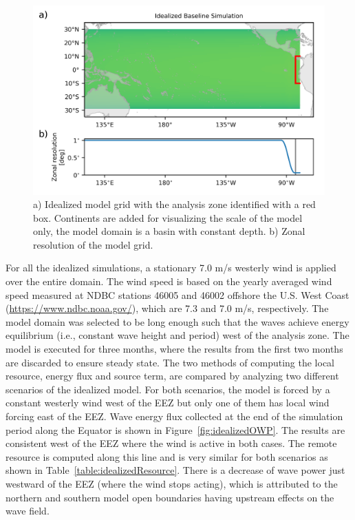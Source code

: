 \begin{figure}[ht]
  \includegraphics[width=4.5in]{../../diagram/appendixB_Figure1.png}
  \caption{a) Idealized model grid with the analysis zone identified with a red box. Continents are added for visualizing the scale of the model only, the model domain is a basin with constant depth. b) Zonal resolution of the model grid.}
  \label{fig:idealizedDomain}
\end{figure}

For all the idealized simulations, a stationary 7.0 m/s westerly wind is applied over the entire domain. The wind speed is based on the yearly averaged wind speed measured at NDBC stations 46005 and 46002 offshore the U.S. West Coast (\url{https://www.ndbc.noaa.gov/}), which are 7.3 and 7.0 m/s, respectively. The model domain was selected to be long enough such that the waves achieve energy equilibrium (i.e., constant wave height and period) west of the analysis zone. The model is executed for three months, where the results from the first two months are discarded to ensure steady state. The two methods of computing the local resource, energy flux and source term, are compared by analyzing two different scenarios of the idealized model. For both scenarios, the model is forced by a constant westerly wind west of the EEZ but only one of them has local wind forcing east of the EEZ. Wave energy flux collected at the end of the simulation period along the Equator is shown in Figure~\ref{fig:idealizedOWP}. The results are consistent west of the EEZ where the wind is active in both cases. The remote resource is computed along this line and is very similar for both scenarios as shown in Table~\ref{table:idealizedResource}. There is a decrease of wave power just westward of the EEZ (where the wind stops acting), which is attributed to the northern and southern model open boundaries having upstream effects on the wave field.

